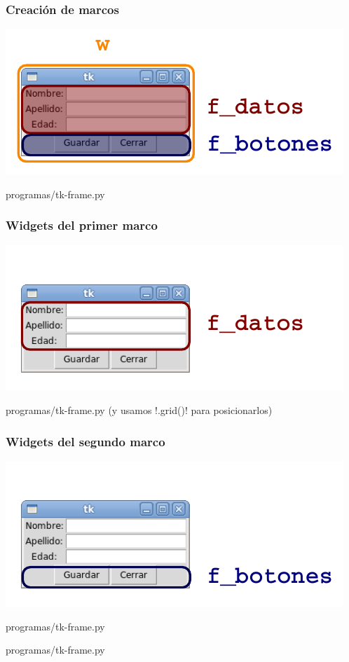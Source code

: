 \documentclass[12pt]{beamer}
\begin{document}
  \begin{frame}
    \label{marcos}
    \frametitle{Creación de marcos}
    \begin{center}
      \includegraphics[width=.7\textwidth]{programas/tkinter/capturas/13-0.pdf}
    \end{center}
    
            {programas/tk-frame.py}
    \vfill
  \end{frame}

  \begin{frame}
    \label{marcos}
    \frametitle{Widgets del primer marco}
    \begin{center}
      \includegraphics[width=.7\textwidth]{programas/tkinter/capturas/13-1.pdf}
    \end{center}
    
            {programas/tk-frame.py}
    \vfill
    (y usamos \li!.grid()! para posicionarlos)
  \end{frame}

  \begin{frame}
    \label{marcos}
    \frametitle{Widgets del segundo marco}
    \begin{center}
      \includegraphics[width=.7\textwidth]{programas/tkinter/capturas/13-2.pdf}
    \end{center}
    
            {programas/tk-frame.py}
    
            {programas/tk-frame.py}
    \vfill
  \end{frame}
\end{document}
